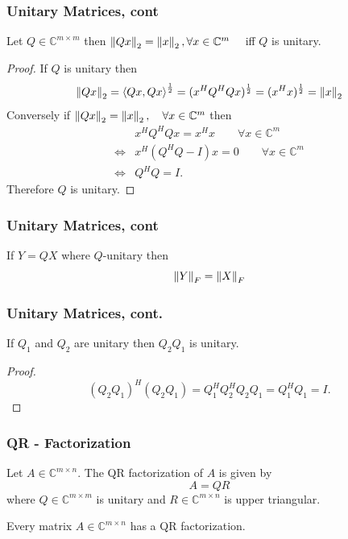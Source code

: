 \documentclass{beamer}
\begin{document}
\begin{frame}\frametitle{Unitary Matrices, cont}
	\begin{lemma}
	Let $Q \in \mathbb{C}^{m \times m}$ then $\left\|Qx \right\|_2 = \left\|x \right\|_2,  \forall x \in \mathbb{C}^m~~~$ iff $Q$ is unitary.
	\end{lemma}
	
	\begin{proof}
		If $Q$ is unitary then
		\[
			\left\|Qx \right\|_2 = \left<Qx,Qx \right>^{\frac{1}{2}} = (x^HQ^HQx)^{\frac{1}{2}} = (x^Hx)^{\frac{1}{2}} = \left\|x \right\|_2 
		\]
		Conversely if $\left\|Qx \right\|_2 = \left\|x \right\|_2, \quad \forall x \in \mathbb{C}^m$ then
		\begin{align*}
			& x^HQ^HQx = x^Hx \qquad \forall x\in \mathbb{C}^m \\
			\iff & x^H(Q^HQ-I)x = 0 \qquad \forall x\in \mathbb{C}^m \\
			\iff & Q^HQ = I.
		\end{align*}
		Therefore $Q$ is unitary.
	\end{proof}
\end{frame}

\begin{frame}\frametitle{Unitary Matrices, cont}
	\begin{lemma}
	If $Y=QX$ where $Q$-unitary then 
	\[ \left\|Y \right\|_F = \left\|X \right\|_F \]
	\end{lemma}
\end{frame}

\begin{frame}\frametitle{Unitary Matrices, cont.}
	\begin{lemma}
		If 	$Q_1$ and $Q_2$ are unitary then $Q_2Q_1$ is unitary.
	\end{lemma}
	\begin{proof}
		\[ 
			(Q_2Q_1)^H(Q_2Q_1) 
				= Q_1^HQ_2^HQ_2Q_1 
				= Q_1^HQ_1 
				= I.
		\]
	\end{proof}
\end{frame}


\begin{frame}\frametitle{QR - Factorization}
	\begin{definition}
		Let $A \in \mathbb{C}^{m \times n}$.  The QR factorization of $A$ is given by
		\[ 
			A = QR 
		\]
		where $Q \in \mathbb{C}^{m \times m}$ is unitary and $R \in \mathbb{C}^{m\times n}$ is upper triangular.
	\end{definition}
	\begin{lemma}
		Every matrix $A\in\mathbb{C}^{m \times n}$ has a QR factorization.	
	\end{lemma}
\end{frame}
\end{document}
